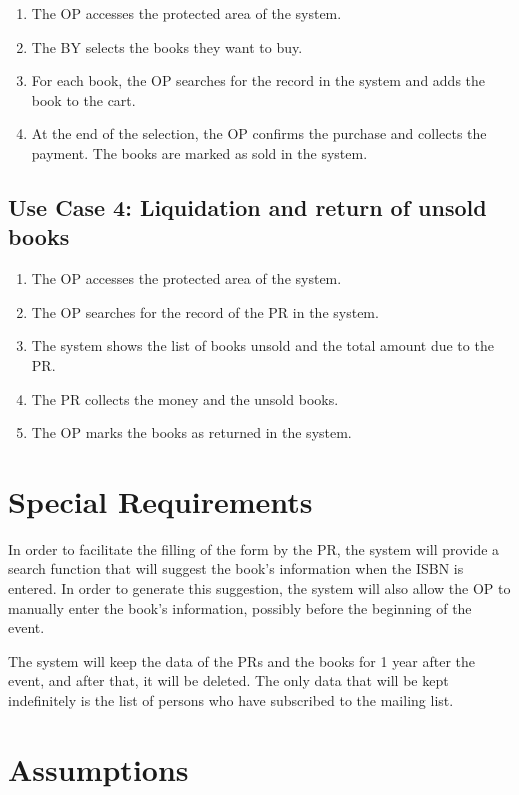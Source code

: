 \begin{enumerate}
    \item The OP accesses the protected area of the system.
    \item The BY selects the books they want to buy.
    \item For each book, the OP searches for the record in the system and adds the book to the cart.
    \item At the end of the selection, the OP confirms the purchase and collects the payment. The books are marked as sold in the system.
\end{enumerate}

\subsection{Use Case 4: Liquidation and return of unsold books}

\begin{enumerate}
    \item The OP accesses the protected area of the system.
    \item The OP searches for the record of the PR in the system.
    \item The system shows the list of books unsold and the total amount due to the PR.
    \item The PR collects the money and the unsold books.
    \item The OP marks the books as returned in the system.
\end{enumerate}

\section{Special Requirements}

In order to facilitate the filling of the form by the PR, the system will provide a search function that will suggest the book's information when the ISBN is entered. In order to generate this suggestion, the system will also allow the OP to manually enter the book's information, possibly before the beginning of the event.

The system will keep the data of the PRs and the books for 1 year after the event, and after that, it will be deleted. The only data that will be kept indefinitely is the list of persons who have subscribed to the mailing list.

\section{Assumptions}
\label{sec:assumptions}


